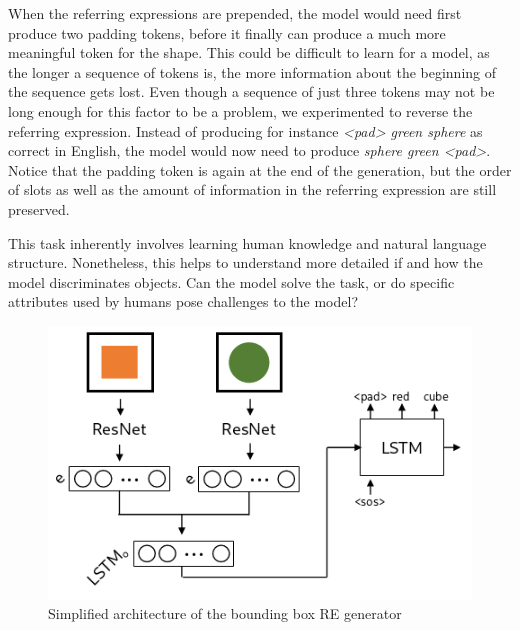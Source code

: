 When the referring expressions are prepended, the model would need first produce two padding tokens, before it finally can produce a much more meaningful token for the shape.
This could be difficult to learn for a model, as the longer a sequence of tokens is, the more information about the beginning of the sequence gets lost.
Even though a sequence of just three tokens may not be long enough for this factor to be a problem, we experimented to reverse the referring expression.
Instead of producing for instance \emph{<pad> green sphere} as correct in English, the model would now need to produce \emph{sphere green <pad>}.
Notice that the padding token is again at the end of the generation, but the order of slots as well as the amount of information in the referring expression are still preserved.

This task inherently involves learning human knowledge and natural language structure.
Nonetheless, this helps to understand more detailed if and how the model discriminates objects.
Can the model solve the task, or do specific attributes used by humans pose challenges to the model?

\begin{figure}[ht]
    \centering
    \includegraphics[width=.5\linewidth]{figures/arch_bb_caption_generator.png}
    \caption{Simplified architecture of the bounding box RE generator}
    \label{fig:bb_re_generator_architecture}
\end{figure}

